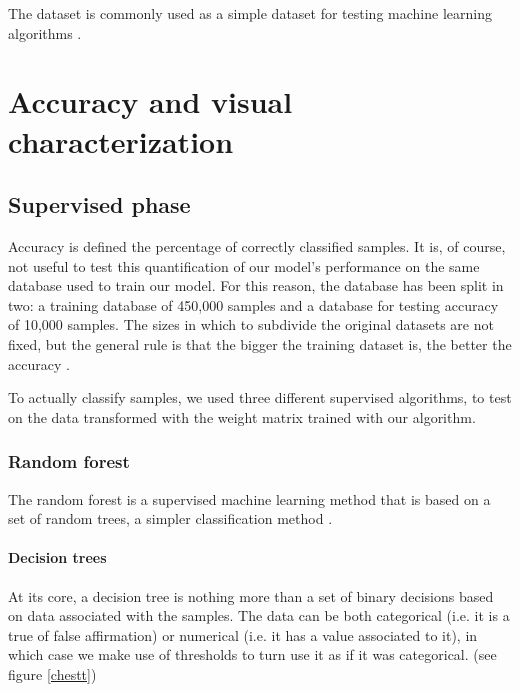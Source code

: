 \documentclass[a4paper]{report}
\begin{document}
The dataset is commonly used as a simple dataset for testing machine learning algorithms \cite{cohen2017emnist}.

\chapter{Accuracy and visual characterization}

\section{Supervised phase}
Accuracy is defined the percentage of correctly classified samples.
It is, of course, not useful to test this quantification of our model's performance on the same database used to train our model.
For this reason, the database has been split in two:
a training database of 450,000 samples and a database for testing accuracy of 10,000 samples.
The sizes in which to subdivide the original datasets are not fixed, but the general rule is that the bigger the training dataset is, the better the accuracy \cite{bishop2006pattern}.

To actually classify samples, we used three different supervised algorithms, to test on the data transformed with the weight matrix trained with our algorithm.

\subsection{Random forest}
The random forest is a supervised machine learning method that is based on a set of random trees, a simpler classification method \cite{breiman2001random}.

\subsubsection{Decision trees}
 At its core, a decision tree is nothing more than a set of binary decisions based on data associated with the samples.
The data can be both categorical (i.e.  it is a true of false affirmation) or numerical (i.e.  it has a value associated to it), in which case we make use of thresholds to turn use it as if it was categorical.
(see figure \ref{chestt})
\end{document}
